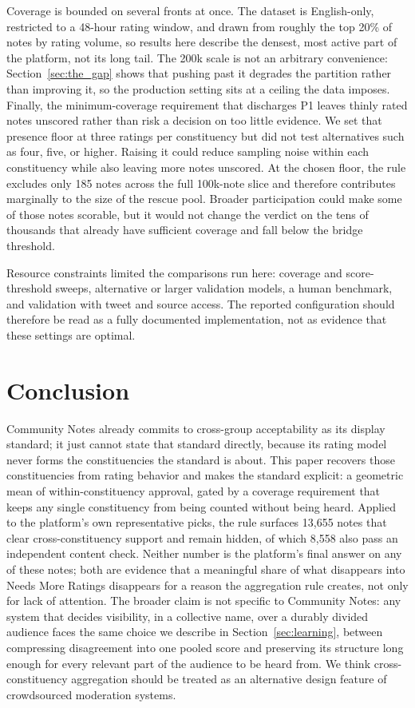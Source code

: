\documentclass[10pt,twocolumn]{article}
\begin{document}
Coverage is bounded on several fronts at once. The dataset is
English-only, restricted to a 48-hour rating window, and drawn from roughly
the top 20\% of notes by rating volume, so results here describe the densest,
most active part of the platform, not its long tail. The 200k scale is not
an arbitrary convenience: Section~\ref{sec:the_gap} shows that pushing past
it degrades the partition rather than improving it, so the production
setting sits at a ceiling the data imposes. Finally, the minimum-coverage
requirement that discharges P1 leaves thinly rated notes unscored rather than
risk a decision on too little evidence. We set that presence floor at three
ratings per constituency but did not test alternatives such as four, five, or
higher. Raising it could reduce sampling noise within each constituency while
also leaving more notes unscored. At the chosen floor, the rule excludes only
185 notes across the full 100k-note slice and therefore contributes marginally
to the size of the rescue pool. Broader participation could make some of those
notes scorable, but it would not change the verdict on the tens of thousands
that already have sufficient coverage and fall below the bridge threshold.

Resource constraints limited the comparisons run here: coverage and
score-threshold sweeps, alternative or larger validation models, a human
benchmark, and validation with tweet and source access. The reported
configuration should therefore be read as a fully documented implementation,
not as evidence that these settings are optimal.

\section{Conclusion}

Community Notes already commits to cross-group acceptability as its display
standard; it just cannot state that standard directly, because its rating
model never forms the constituencies the standard is about. This paper
recovers those constituencies from rating behavior and makes the standard
explicit: a geometric mean of within-constituency approval, gated by a
coverage requirement that keeps any single constituency from being counted
without being heard. Applied to the platform's own representative picks, the
rule surfaces 13,655 notes that clear cross-constituency support and remain
hidden, of which 8,558 also pass an independent content check. Neither
number is the platform's final answer on any of these notes; both are
evidence that a meaningful share of what disappears into Needs More Ratings
disappears for a reason the aggregation rule creates, not only for lack of
attention. The broader claim is not specific to Community Notes: any system
that decides visibility, in a collective name, over a durably divided
audience faces the same choice we describe in Section~\ref{sec:learning},
between compressing disagreement into one pooled score and preserving its
structure long enough for every relevant part of the audience to be heard
from. We think cross-constituency aggregation should be treated as an
alternative design feature of crowdsourced moderation systems.
\end{document}
